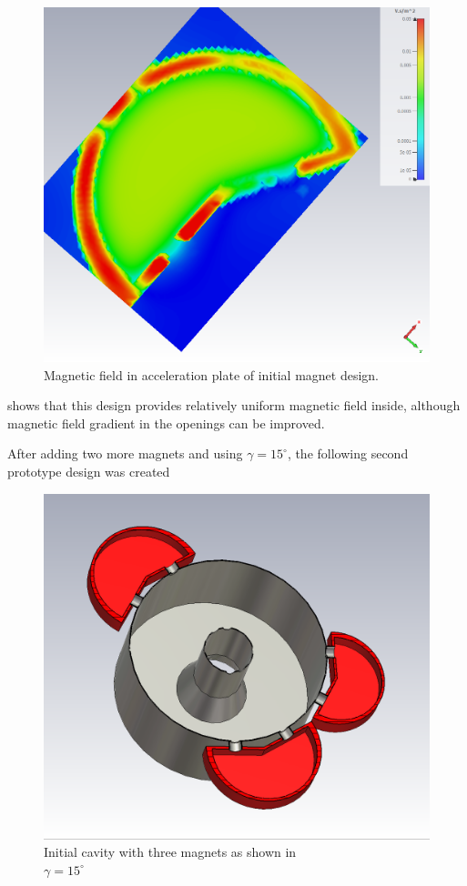 \documentclass[a4paper,oneside,12pt]{report}
\numberwithin{equation}{chapter}
\begin{document}
\begin{figure}[H]
    \centering
    \captionsetup{justification=centering}
    \includegraphics[width=.8\linewidth]{./figures/cst/cst_first_magnet_design3.png}
    \caption{Magnetic field in acceleration plate of initial magnet design.}
    \label{fig:initial_magnet_design_B}
\end{figure}

 shows that this design provides relatively uniform magnetic field inside, although magnetic field gradient in the openings can be improved. 

After adding two more magnets and using $\gamma=15^\circ$, the following second prototype design was created

\begin{figure}[H]
    \centering
    \captionsetup{justification=centering}
    \includegraphics[width=.8\linewidth]{./figures/cst/cst_second_design2.png}
    \caption{Initial cavity with three magnets as shown in  \\ $\gamma=15^\circ$}
    \label{fig:initial_three_magnet_design}
\end{figure}
\end{document}
